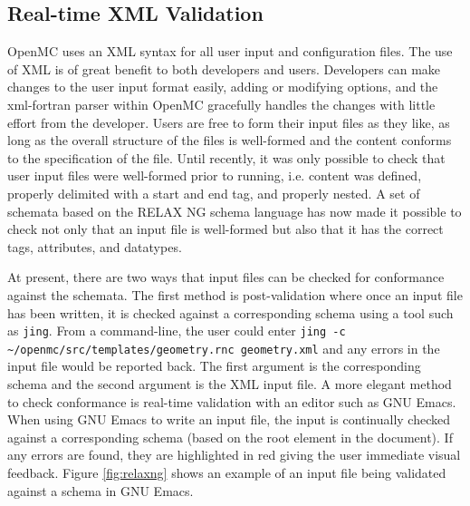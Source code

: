 \documentclass{ansconf}
\begin{document}
\subsection{Real-time XML Validation}

OpenMC uses an XML syntax for all user input and configuration files. The use of
XML is of great benefit to both developers and users. Developers can make
changes to the user input format easily, adding or modifying options, and the
xml-fortran parser within OpenMC gracefully handles the changes with little
effort from the developer. Users are free to form their input files as they
like, as long as the overall structure of the files is well-formed and the
content conforms to the specification of the file.  Until recently, it was only
possible to check that user input files were well-formed prior to running,
i.e. content was defined, properly delimited with a start and end tag, and
properly nested. A set of schemata based on the RELAX NG schema language
\cite{relaxng-2008} has now made it possible to check not only that an input
file is well-formed but also that it has the correct tags, attributes, and
datatypes.

At present, there are two ways that input files can be checked for conformance
against the schemata. The first method is post-validation where once an input
file has been written, it is checked against a corresponding schema using a tool
such as \texttt{jing}. From a command-line, the user could enter \texttt{jing -c
  \textasciitilde/openmc/src/templates/geometry.rnc geometry.xml} and any errors
in the input file would be reported back. The first argument is the
corresponding schema and the second argument is the XML input file. A more
elegant method to check conformance is real-time validation with an editor such
as GNU Emacs. When using GNU Emacs to write an input file, the input is
continually checked against a corresponding schema (based on the root element in
the document). If any errors are found, they are highlighted in red giving the
user immediate visual feedback. Figure \ref{fig:relaxng} shows an example of an
input file being validated against a schema in GNU Emacs.
\end{document}
